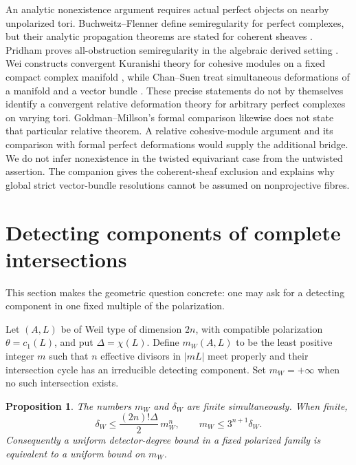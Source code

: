 \documentclass[11pt]{article}
\newtheorem{proposition}[theorem]{Proposition}
\theoremstyle{definition}
\theoremstyle{remark}
\begin{document}
An analytic nonexistence argument requires actual perfect objects on
nearby unpolarized tori. Buchweitz--Flenner define semiregularity for
perfect complexes, but their analytic propagation theorems are stated
for coherent sheaves \cite[Definition~4.1, pp.~165--166;
Theorems~5.1 and~7.3, pp.~174--179 and~189]{BF}.
Pridham proves all-obstruction semiregularity in the algebraic derived
setting \cite[Corollaries~2.24--2.25, pp.~18--20]{Pridham}.
Wei constructs convergent Kuranishi theory for cohesive modules on
a fixed compact complex manifold \cite[Theorem~3.11 and \S5]{WeiCohesive},
while Chan--Suen treat simultaneous deformations of a manifold and a
vector bundle \cite[\S\S3,5--6]{ChanSuen}.
These precise statements do not by themselves identify a convergent
relative deformation theory for arbitrary perfect complexes on varying
tori. Goldman--Millson's formal comparison
\cite[\S1.1, p.~49; \S\S2--3]{GoldmanMillson} likewise does not state
that particular relative theorem. A relative cohesive-module argument
and its comparison with formal perfect deformations would supply the
additional bridge. We do not infer nonexistence in the twisted
equivariant case from the untwisted assertion. The companion gives the
coherent-sheaf exclusion and explains why global strict vector-bundle
resolutions cannot be assumed on nonprojective fibres.

\section{Detecting components of complete intersections}
\label{sec:complete-intersections}
This section makes the geometric question concrete: one may ask for a detecting component in one fixed multiple of the polarization.

Let $(A,L)$ be of Weil type of dimension $2n$, with compatible polarization $\theta=c_1(L)$, and put $\Delta=\chi(L)$. Define $m_W(A,L)$ to be the least positive integer $m$ such that $n$ effective divisors in $|mL|$ meet properly and their intersection cycle has an irreducible detecting component. Set $m_W=+\infty$ when no such intersection exists.

\begin{proposition}\label{prop:complete-intersections}
The numbers $m_W$ and $\delta_W$ are finite simultaneously. When finite,
\[
 \delta_W\leq\frac{(2n)!\Delta}{2}\,m_W^n,
 \qquad m_W\leq3^{n+1}\delta_W.
\]
Consequently a uniform detector-degree bound in a fixed polarized family is equivalent to a uniform bound on $m_W$.
\end{proposition}
\end{document}
